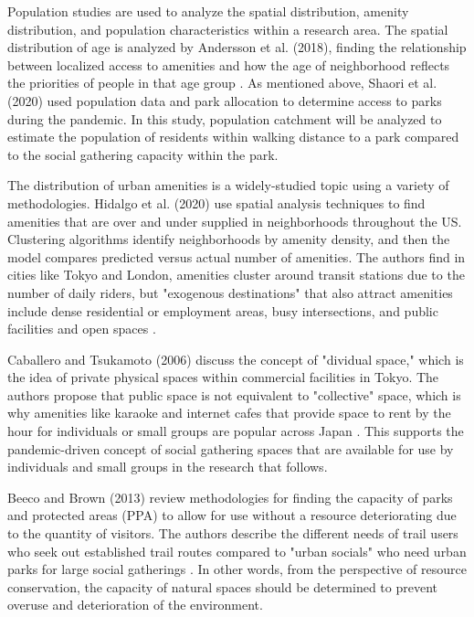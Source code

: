 \begin{multicols}{2}
Population studies are used to analyze the spatial distribution, amenity distribution, and population characteristics within a research area. The spatial distribution of age is analyzed by Andersson et al. (2018), finding the relationship between localized access to amenities and how the age of neighborhood reflects the priorities of people in that age group \cite{andersson_urban_2018}. As mentioned above, Shaori et al. (2020) used population data and park allocation to determine access to parks during the pandemic. In this study, population catchment will be analyzed to estimate the population of residents within walking distance to a park compared to the social gathering capacity within the park. 

The distribution of urban amenities is a widely-studied topic using a variety of methodologies. Hidalgo et al. (2020) use spatial analysis techniques to find amenities that are over and under supplied in neighborhoods throughout the US. Clustering algorithms identify neighborhoods by amenity density, and then the model compares predicted versus actual number of amenities. The authors find in cities like Tokyo and London, amenities cluster around transit stations due to the number of daily riders, but "exogenous destinations" that also attract amenities include dense residential or employment areas, busy intersections, and public facilities and open spaces \cite{hidalgo_amenity_2020}.

Caballero and Tsukamoto (2006) discuss the concept of "dividual space," which is the idea of private physical spaces within commercial facilities in Tokyo. The authors propose that public space is not equivalent to "collective" space, which is why amenities like karaoke and internet cafes that provide space to rent by the hour for individuals or small groups are popular across Japan \cite{caballero_tokyo_2006}. This supports the pandemic-driven concept of social gathering spaces that are available for use by individuals and small groups in the research that follows. 

Beeco and Brown (2013) review methodologies for finding the capacity of parks and protected areas (PPA) to allow for use without a resource deteriorating due to the quantity of visitors. The authors describe the different needs of trail users who seek out established trail routes compared to "urban socials" who need urban parks for large social gatherings \cite{beeco_integrating_2013}. In other words, from the perspective of resource conservation, the capacity of natural spaces should be determined to prevent overuse and deterioration of the environment. 


\end{multicols}
